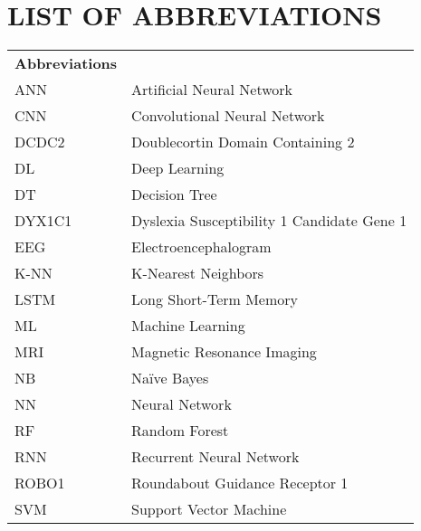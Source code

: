 \chapter{LIST OF ABBREVIATIONS}

\par\noindent
\vspace{2cm}
\begin{tabular}{@{}p{30mm}l@{}}
\textbf{Abbreviations}  & \\
ANN & Artificial Neural Network\\
CNN & Convolutional Neural Network\\
DCDC2 & Doublecortin Domain Containing 2\\
DL & Deep Learning\\
DT & Decision Tree\\
DYX1C1 & Dyslexia Susceptibility 1 Candidate Gene 1\\
EEG & Electroencephalogram\\
K-NN & K-Nearest Neighbors\\
LSTM & Long Short-Term Memory\\
ML & Machine Learning\\
MRI & Magnetic Resonance Imaging\\
NB & Naïve Bayes\\
NN & Neural Network\\
RF & Random Forest\\
RNN & Recurrent Neural Network\\
ROBO1 & Roundabout Guidance Receptor 1\\
SVM & Support Vector Machine\\
\end{tabular}


